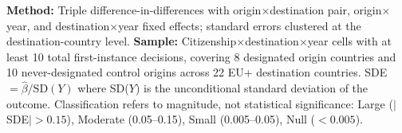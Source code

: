 \begin{table}[H]
\begin{threeparttable}
\begin{tablenotes}[flushleft]
\textbf{Method:} Triple difference-in-differences with origin$\times$destination pair, origin$\times$year, and destination$\times$year fixed effects; standard errors clustered at the destination-country level.
\textbf{Sample:} Citizenship$\times$destination$\times$year cells with at least 10 total first-instance decisions, covering 8 designated origin countries and 10 never-designated control origins across 22 EU+ destination countries.
SDE $= \hat{\beta} / \text{SD}(Y)$ where SD($Y$) is the unconditional standard deviation of the outcome. Classification refers to magnitude, not statistical significance: Large ($|$SDE$| > 0.15$), Moderate (0.05--0.15), Small (0.005--0.05), Null ($< 0.005$).
\end{tablenotes}
\end{threeparttable}
\end{table}
